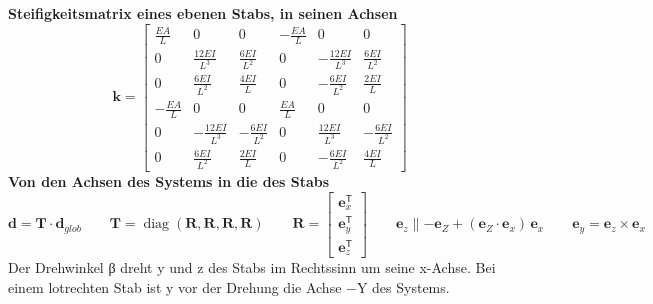 \documentclass[11pt,a4paper]{article}
\begin{document}
\noindent\textbf{Steifigkeitsmatrix eines ebenen Stabs, in seinen Achsen}
\begin{equation*}
\mathbf{k} = \begin{bmatrix} \frac{EA}{L} & 0 & 0 & -\frac{EA}{L} & 0 & 0 \\ 0 & \frac{12EI}{L^3} & \frac{6EI}{L^2} & 0 & -\frac{12EI}{L^3} & \frac{6EI}{L^2} \\ 0 & \frac{6EI}{L^2} & \frac{4EI}{L} & 0 & -\frac{6EI}{L^2} & \frac{2EI}{L} \\ -\frac{EA}{L} & 0 & 0 & \frac{EA}{L} & 0 & 0 \\ 0 & -\frac{12EI}{L^3} & -\frac{6EI}{L^2} & 0 & \frac{12EI}{L^3} & -\frac{6EI}{L^2} \\ 0 & \frac{6EI}{L^2} & \frac{2EI}{L} & 0 & -\frac{6EI}{L^2} & \frac{4EI}{L} \end{bmatrix}
\end{equation*}
\noindent\textbf{Von den Achsen des Systems in die des Stabs}
\begin{equation*}
\mathbf{d} = \mathbf{T} \cdot \mathbf{d}_{glob} \qquad \mathbf{T} = \operatorname{diag}(\mathbf{R}, \mathbf{R}, \mathbf{R}, \mathbf{R}) \qquad \mathbf{R} = \begin{bmatrix} \mathbf{e}_x^{\mathsf{T}} \\ \mathbf{e}_y^{\mathsf{T}} \\ \mathbf{e}_z^{\mathsf{T}} \end{bmatrix} \qquad \mathbf{e}_z \parallel -\mathbf{e}_Z + (\mathbf{e}_Z \cdot \mathbf{e}_x)\,\mathbf{e}_x \qquad \mathbf{e}_y = \mathbf{e}_z \times \mathbf{e}_x
\end{equation*}
Der Drehwinkel β dreht y und z des Stabs im Rechtssinn um seine x-Achse. Bei einem lotrechten Stab ist y vor der Drehung die Achse −Y des Systems.
\end{document}
